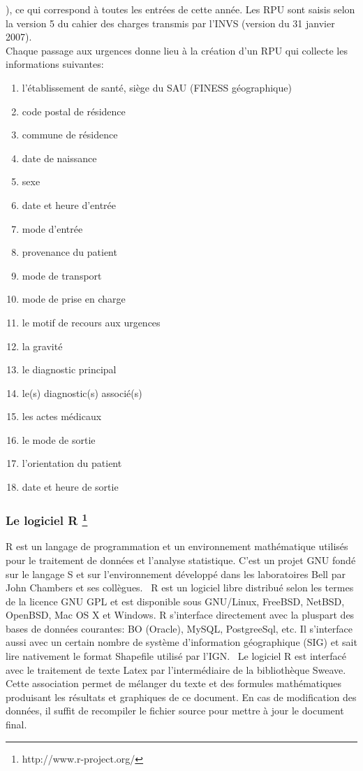 \documentclass[12pt,english,french,twoside]{report}\usepackage[]{graphicx}\usepackage[]{color}
\begin{document}
{\ttfamily\noindent\bfseries\color{errorcolor}{\\Error in eval(expr, envir, enclos) : objet 'd2' introuvable}}), ce qui correspond à toutes les entrées de cette année. Les RPU sont saisis selon la version 5 du cahier des charges transmis par l'INVS (version du 31 janvier 2007).
\\
Chaque passage aux urgences donne lieu à la création d'un RPU qui collecte les informations suivantes:
\begin{enumerate}
  \item l'établissement de santé, siège du SAU (FINESS géographique)
  \item code postal de résidence
  \item commune de résidence
  \item date de naissance
  \item sexe
  \item date et heure d'entrée
  \item mode d'entrée
  \item provenance du patient
  \item mode de transport
  \item mode de prise en charge
  \item le motif de recours aux urgences
  \item la gravité
  \item le diagnostic principal
  \item le(s) diagnostic(s) associé(s)
  \item les actes médicaux
  \item le mode de sortie
  \item l'orientation du patient
  \item date et heure de sortie
\end{enumerate}


\subsubsection*{Le logiciel R \footnote{http://www.r-project.org/}}

R est un langage de programmation et un environnement mathématique utilisés pour le traitement de données et l'analyse statistique. C'est un projet GNU fondé sur le langage S et sur l'environnement développé dans les laboratoires Bell par John Chambers et ses collègues. 
\
R est un logiciel libre distribué selon les termes de la licence GNU GPL et est disponible sous GNU/Linux, FreeBSD, NetBSD, OpenBSD, Mac OS X et Windows. R s'interface directement avec la pluspart des bases de données courantes: BO (Oracle), MySQL, PostgreeSql, etc. Il s'interface aussi avec un certain nombre de système d'information géographique (SIG) et sait lire nativement le format Shapefile utilisé par l'IGN.
\
Le logiciel R est interfacé avec le traitement de texte Latex par l'intermédiaire de la bibliothèque Sweave. Cette association permet de mélanger du texte et des formules mathématiques produisant les résultats et graphiques de ce document. En cas de modification des données, il suffit de recompiler le fichier source pour mettre à jour le document final.
\end{document}
